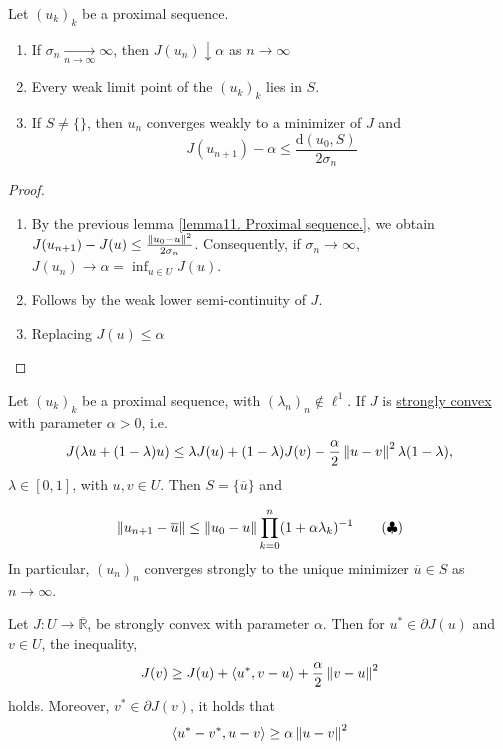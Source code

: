 \begin{theorem}
	Let $(u_k)_k$ be a proximal sequence.
	
	\begin{enumerate}
		\item If $\sigma_n \xrightarrow[n\rightarrow\infty]{}\infty$, then $J(u_n) \downarrow \alpha$ as $n\rightarrow \infty$
		\item Every weak limit point of the $(u_k)_k$ lies in $S$.
		\item  If $S\neq\{\}$, then $u_n$ converges weakly to a minimizer of $J$ and 
		\[
			J(u_{n+1}) - \alpha \leq \frac{\mathrm{d}(u_0, S)}{2 \sigma_n}
		\]
	\end{enumerate}
	\begin{proof} \
		\begin{enumerate}

		\item 		By the previous lemma \eqref{lemma11. Proximal sequence.}, we obtain $J(u_{n+1})-J(u) \leq \frac{\left\lVert u_0-u\right\rVert^2}{2\sigma_n}$. Consequently, if $\sigma_n \rightarrow \infty$, $J(u_n)\rightarrow \alpha = \inf_{u\in U } J(u)$.
		\item Follows by the weak lower semi-continuity of $J$.
		\item Replacing $J(u)\leq \alpha$
		\end{enumerate}
	\end{proof}
\end{theorem}

\begin{theorem}
	Let $(u_k)_k$ be a proximal sequence, with $(\lambda_n)_n \notin \ell^1$. If $J$ is \underline{strongly convex} with parameter $\alpha > 0$, i.e. \[J(\lambda u + (1-\lambda)u) \leq \lambda J(u)+ (1-\lambda) J(v) -\frac{\alpha}{2} \left\lVert u-v\right\rVert^2\lambda (1-\lambda),\] $\lambda \in [0,1]$, with $u,v \in U$. Then $S=\{\overline{u}\}$ and 
	
	\begin{equation}
		\label{eq11. Ineq Prod.}\left\lVert u_{n+1}-\overline{u}\right\rVert \leq \left\lVert u_0-u\right\rVert \prod_{k=0}^{n} (1+\alpha \lambda_k)^{-1} \tag{$\clubsuit$}
	\end{equation}
	In particular, $(u_n)_n$ converges strongly to the unique minimizer $\overline{u} \in S$ as $n\rightarrow \infty$.
\end{theorem}

\begin{lemma}
	Let $J:U\rightarrow \overline{\mathbb{R}}$, be strongly convex with parameter $\alpha$. Then for $u^* \in \partial J(u)$ and $v\in U$, the inequality,
	\begin{align}
		J(v)\geq J(u)+\langle u^*, v-u\rangle +\frac{\alpha}{2}\left\lVert v-u\right\rVert^2
	\end{align}
	holds. Moreover, $v^* \in \partial J(v)$, it holds that 
	\begin{equation}
		\langle u^*-v^*, u-v\rangle \geq \alpha \left\lVert u-v\right\rVert^2
	\end{equation}
\end{lemma}

